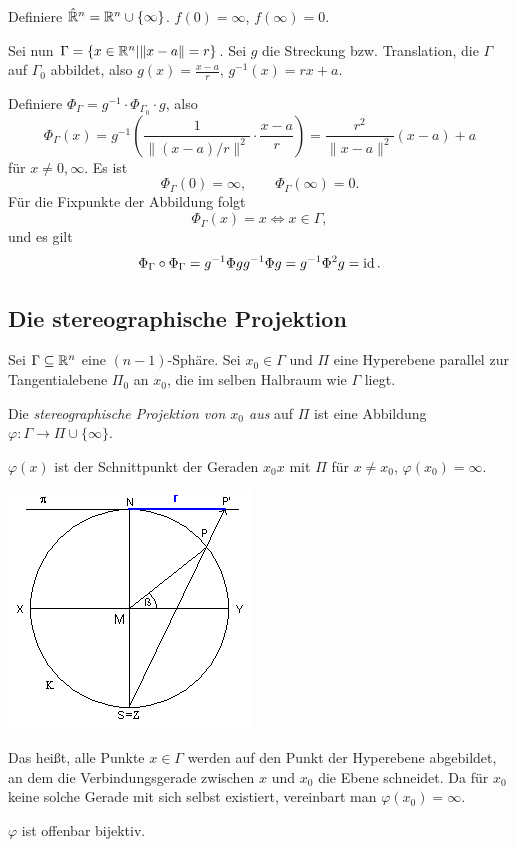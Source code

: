 Definiere $\hat{\mathbb{R}}^n = \mathbb{R}^n \cup \{ \infty \}$. $f(0) = \infty$, $f(\infty) = 0$.

Sei nun $\Gamma = \{ x \in \mathbb{R}^n | \| x-a \| = r \}$. Sei $g$ die Streckung bzw. Translation, die $\Gamma$ auf $\Gamma_0$ abbildet, also $g(x) = \frac{x-a}{r}$, $g^{-1}(x) = rx + a$.

Definiere $\Phi_\Gamma = g^{-1} \cdot \Phi_{\Gamma_0} \cdot g$, also 
\[ \Phi_\Gamma(x) = g^{-1} \left( \frac{1}{\| (x-a)/r \|^2} \cdot \frac{x-a}{r} \right) = \frac{r^2}{\|x-a\|^2}(x-a) + a \]
für $x \ne 0, \infty$. Es ist
\[ \Phi_\Gamma( 0 ) = \infty, \qquad \Phi_\Gamma( \infty ) = 0. \]
Für die Fixpunkte der Abbildung folgt
\[ \Phi_\Gamma(x) = x \Leftrightarrow x \in \Gamma, \]
und es gilt
\[ \Phi_\Gamma \circ \Phi_\Gamma = g^{-1} \Phi g g^{-1} \Phi g = g^{-1} \Phi^2 g = \mathrm{id}\,. \]

\subsection{Die stereographische Projektion}
\begin{defn*}
 Sei $\Gamma \subseteq \mathbb{R}^n$ eine $(n-1)$-Sphäre. Sei $x_0 \in \Gamma$ und $\Pi$ eine Hyperebene parallel zur Tangentialebene $\Pi_0$ an $x_0$, die im selben Halbraum wie $\Gamma$ liegt.

 Die \emph{stereographische Projektion von $x_0$ aus} auf $\Pi$ ist eine
 Abbildung  $\varphi: \Gamma \to \Pi \cup \{ \infty \}$.

 $\varphi(x)$ ist der Schnittpunkt der Geraden $x_0 x$ mit $\Pi$ für $x \ne
 x_0$, $\varphi(x_0) = \infty$.

 \begin{center}
   \includegraphics{img/stereo}
 \end{center}
 
 Das heißt, alle Punkte $x \in \Gamma$ werden auf den Punkt der Hyperebene
 abgebildet, an dem die Verbindungsgerade zwischen $x$ und $x_0$ die Ebene
 schneidet. Da für $x_0$ keine solche Gerade mit sich selbst  existiert,
 vereinbart man $\varphi(x_0) = \infty$.

 $\varphi$ ist offenbar bijektiv.
\end{defn*}

